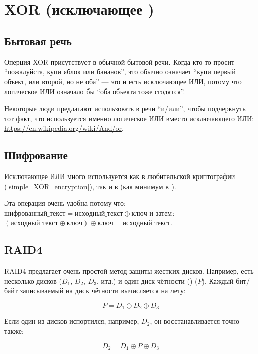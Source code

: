 ﻿\section{XOR (исключающее )}
\label{XOR_property}



\subsection{Бытовая речь}

Оперция XOR присутствует в обычной бытовой речи.
Когда кто-то просит ``пожалуйста, купи яблок или бананов'',
это обычно означает ``купи первый объект, или второй, но не оба'' --- это и есть исключающее ИЛИ,
потому что логическое ИЛИ означало бы ``оба объекта тоже сгодятся''.

Некоторые люди предлагают использовать в речи ``и/или'', чтобы подчеркнуть тот факт, что используется именно логическое ИЛИ
вместо исключающего ИЛИ: \url{https://en.wikipedia.org/wiki/And/or}.

\subsection{Шифрование}

Исключающее ИЛИ много используется как в любительской криптографии (\ref{simple_XOR_encryption}), так и в 
(как минимум в ).

Эта операция очень удобна потому что:
$шифрованный\_текст = исходный\_текст \oplus ключ$ и затем:
$(исходный\_текст \oplus ключ) \oplus ключ = исходный\_текст$.

\subsection{\ac{RAID}4}

\ac{RAID}4 предлагает очень простой метод защиты жестких дисков.
Например, есть несколько дисков ($D_1$, $D_2$, $D_3$, итд.) и один диск чётности () ($P$).
Каждый бит/байт записываемый на диск чётности вычисляется на лету:

\begin{equation} \label{eq:RAID4}
P = D_1 \oplus D_2 \oplus D_3
\end{equation}

Если один из дисков испортился, например, $D_2$, он восстанавливается точно также:

\begin{equation}
D_2 = D_1 \oplus P \oplus D_3
\end{equation}

